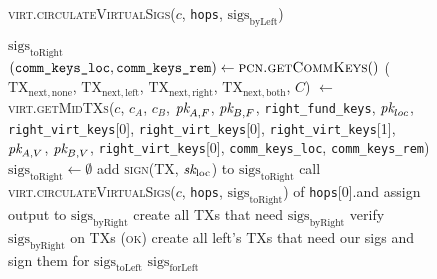 \begin{figure}[H]
\begin{processbox}{\textsc{virt.circulateVirtualSigs}($c$, \texttt{hops},
  $\mathrm{sigs}_{\mathrm{byLeft}}$)}
\begin{algorithmic}[1]
{            $\mathrm{sigs}_{\mathrm{toRight}}$}
          \EndFor
          \State {}
          \State {} \TODO{}
          \State {}
          \TODO{}
          \State {} 
        \EndIf
      \Else \: 
        \State $(\texttt{comm\_keys\_loc}, \texttt{comm\_keys\_rem}) \gets
        \textsc{pcn.getCommKeys}()$
        \State ($\mathrm{TX}_{\mathrm{next}, \mathrm{none}}$,
        $\mathrm{TX}_{\mathrm{next}, \mathrm{left}}$,
        $\mathrm{TX}_{\mathrm{next}, \mathrm{right}}$,
        $\mathrm{TX}_{\mathrm{next}, \mathrm{both}}$, $C$) $\gets$
        \textsc{virt.getMidTXs}($c$, $c_A$, $c_B$, $\textit{pk}_{A, F}$, $\textit{pk}_{B, F}$,
        \texttt{right\_fund\_keys}, $\textit{pk}_{loc}$, \texttt{right\_virt\_keys}[0],
        \texttt{right\_virt\_keys}[0], \texttt{right\_virt\_keys}[1], $\textit{pk}_{A,
        V}$, $\textit{pk}_{B, V}$, \texttt{right\_virt\_keys}[0],
        \texttt{comm\_keys\_loc}, \texttt{comm\_keys\_rem})
        \State $\mathrm{sigs}_{\mathrm{toRight}} \gets \emptyset$
          \State add \textsc{sign}(TX, $\textit{sk}_{\mathrm{loc}}$) to
          $\mathrm{sigs}_{\mathrm{toRight}}$
        \EndFor
        \State call \textsc{virt.circulateVirtualSigs}($c$, \texttt{hops},
        $\mathrm{sigs}_{\mathrm{toRight}}$) of \texttt{hops}[0].\bob and
        assign output to $\mathrm{sigs}_{\mathrm{byRight}}$
        \State create all TXs that need $\mathrm{sigs}_{\mathrm{byRight}}$
        \TODO{}
        \State verify $\mathrm{sigs}_{\mathrm{byRight}}$ on TXs \TODO{}
        \State \Return (\textsc{ok})
      \EndIf
       
        \State create all left's TXs that need our sigs and sign
        them for $\mathrm{sigs}_{\mathrm{toLeft}}$ \TODO{}
        \State \Return $\mathrm{sigs}_{\mathrm{forLeft}}$
      \EndIf
    \end{algorithmic}
  \end{processbox}
  \caption{}
  \label{code:virtual-layer:virtual-sigs}
\end{figure}

